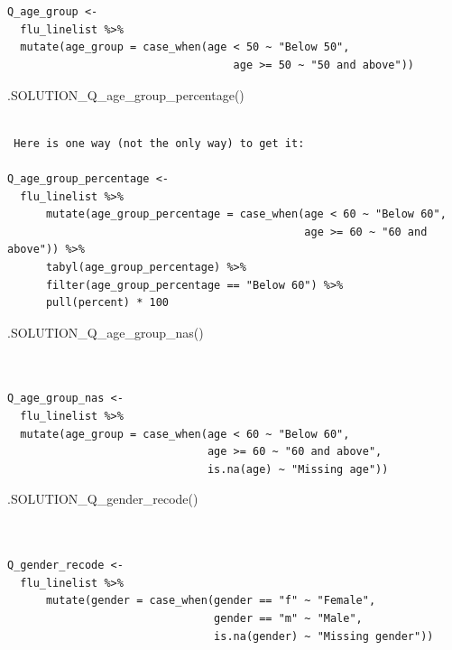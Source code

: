 \documentclass[
  letterpaper,
  DIV=11,
  numbers=noendperiod]{scrreprt}
\newenvironment{Shaded}{\begin{snugshade}}{\end{snugshade}}
\newcommand{\FunctionTok}[1]{\textcolor[rgb]{0.28,0.35,0.67}{#1}}
\newcommand{\NormalTok}[1]{\textcolor[rgb]{0.00,0.23,0.31}{#1}}
\begin{document}
\begin{verbatim}


Q_age_group <- 
  flu_linelist %>% 
  mutate(age_group = case_when(age < 50 ~ "Below 50", 
                                   age >= 50 ~ "50 and above"))
\end{verbatim}

\begin{Shaded}
\begin{Highlighting}[]
\FunctionTok{.SOLUTION\_Q\_age\_group\_percentage}\NormalTok{()}
\end{Highlighting}
\end{Shaded}

\begin{verbatim}

 Here is one way (not the only way) to get it:
  
Q_age_group_percentage <- 
  flu_linelist %>% 
      mutate(age_group_percentage = case_when(age < 60 ~ "Below 60", 
                                              age >= 60 ~ "60 and above")) %>% 
      tabyl(age_group_percentage) %>% 
      filter(age_group_percentage == "Below 60") %>% 
      pull(percent) * 100
\end{verbatim}

\begin{Shaded}
\begin{Highlighting}[]
\FunctionTok{.SOLUTION\_Q\_age\_group\_nas}\NormalTok{()}
\end{Highlighting}
\end{Shaded}

\begin{verbatim}


Q_age_group_nas <- 
  flu_linelist %>% 
  mutate(age_group = case_when(age < 60 ~ "Below 60", 
                               age >= 60 ~ "60 and above", 
                               is.na(age) ~ "Missing age"))
\end{verbatim}

\begin{Shaded}
\begin{Highlighting}[]
\FunctionTok{.SOLUTION\_Q\_gender\_recode}\NormalTok{()}
\end{Highlighting}
\end{Shaded}

\begin{verbatim}


Q_gender_recode <- 
  flu_linelist %>%  
      mutate(gender = case_when(gender == "f" ~ "Female",
                                gender == "m" ~ "Male",
                                is.na(gender) ~ "Missing gender"))
\end{verbatim}
\end{document}
